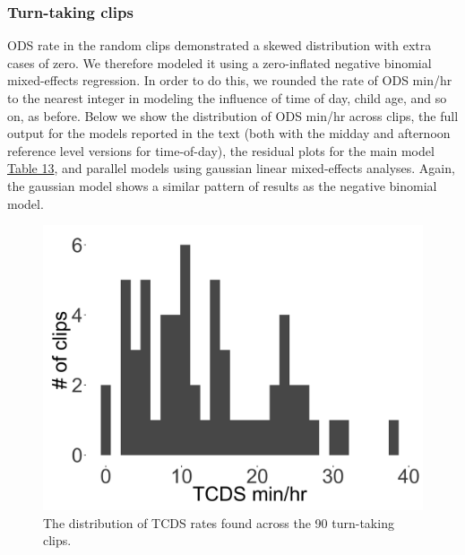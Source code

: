 \documentclass[floatsintext,man]{apa6}
\theoremstyle{definition}
\theoremstyle{definition}
\theoremstyle{definition}
\theoremstyle{remark}
\begin{document}
\newpage

\subsubsection{Turn-taking clips}\label{models-ods-turntaking}

ODS rate in the random clips demonstrated a skewed distribution with
extra cases of zero. We therefore modeled it using a zero-inflated
negative binomial mixed-effects regression. In order to do this, we
rounded the rate of ODS min/hr to the nearest integer in modeling the
influence of time of day, child age, and so on, as before. Below we show
the distribution of ODS min/hr across clips, the full output for the
models reported in the text (both with the midday and afternoon
reference level versions for time-of-day), the residual plots for the
main model \protect\hyperlink{tab13}{Table 13}, and parallel models
using gaussian linear mixed-effects analyses. Again, the gaussian model
shows a similar pattern of results as the negative binomial model.

\begin{figure}

{\centering \includegraphics[width=0.4\linewidth]{www/TCDS_turntaking_distribution} 

}

\caption{The distribution of TCDS rates found across the 90 turn-taking clips.}\label{fig:fig10}
\end{figure}
\end{document}
